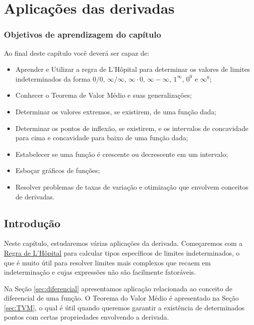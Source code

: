 \cleardoublepage\documentclass[../main.tex]{subfiles}
\begin{document}
\chapter{Aplicações das derivadas}\label{cap:apl_derivadas}
\minitoc
\subsection*{Objetivos de aprendizagem do capítulo}
Ao final deste capítulo você deverá ser capaz de:
\begin{itemize}
\item Aprender e Utilizar a regra de L’Hôpital para determinar os valores de limites indeterminados da forma \(0/0\), \(\infty/\infty\), \(\infty\cdot 0\), \(\infty-\infty\), \(1^\infty\), \(0^0\) e \(\infty^0\); 
\item Conhecer o Teorema de Valor Médio e suas generalizações;
\item Determinar os valores extremos, se existirem, de uma função dada;
    \item Determinar os pontos de inflexão, se existirem, e os intervalos de concavidade para cima e concavidade para baixo de uma função dada;
    \item Estabelecer se uma função é crescente ou decrescente em um intervalo;
    \item Esboçar gráficos de funções;
    \item Resolver problemas de taxas de variação e otimização que envolvem conceitos de derivadas.
\end{itemize}

\section{Introdução}
Neste capítulo, estudaremos várias aplicações da derivada. Começaremos com a \hyperlink{sec:lopital}{Regra de L’Hôpital} para calcular tipos específicos de limites indeterminados, o que é muito útil para resolver limites mais complexos que recaem em indeterminação e cujas expressões não são facilmente fatoráveis.

 Na Seção \ref{sec:diferencial} apresentamos aplicação relacionada ao conceito de diferencial de uma função. O Teorema do Valor Médio é apresentado na Seção \ref{sec:TVM}, o qual é útil quando queremos garantir a existência
de determinados pontos com certas propriedades envolvendo a derivada.
\end{document}

